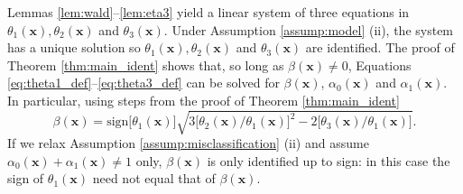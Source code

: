 Lemmas \ref{lem:wald}--\ref{lem:eta3} yield a linear system of three equations in $\theta_1(\mathbf{x}), \theta_2(\mathbf{x})$ and $\theta_3(\mathbf{x})$.
Under Assumption \ref{assump:model} (ii), the system has a unique solution so $\theta_1(\mathbf{x}), \theta_2(\mathbf{x})$ and $\theta_3(\mathbf{x})$ are identified.
The proof of Theorem \ref{thm:main_ident} shows that, so long as $\beta(\mathbf{x})\neq 0$, Equations \ref{eq:theta1_def}--\ref{eq:theta3_def} can be solved for $\beta(\mathbf{x})$, $\alpha_0(\mathbf{x})$ and $\alpha_1(\mathbf{x})$.
In particular, using steps from the proof of Theorem \ref{thm:main_ident}
\[
  \beta(\mathbf{x}) = \mbox{sign}\big[ \theta_1(\mathbf{x}) \big] \sqrt{3 \big[ \theta_2(\mathbf{x})/\theta_1(\mathbf{x}) \big]^2 - 2\big[\theta_3(\mathbf{x})/\theta_1(\mathbf{x})\big]}.
\]
If we relax Assumption \ref{assump:misclassification} (ii) and assume $\alpha_0(\mathbf{x}) + \alpha_1(\mathbf{x}) \neq 1$ only, $\beta(\mathbf{x})$ is only identified up to sign: in this case the sign of $\theta_1(\mathbf{x})$ need not equal that of $\beta(\mathbf{x})$.

